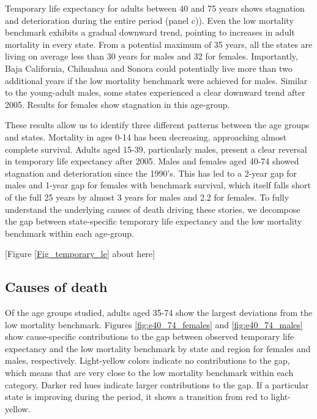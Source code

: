 \documentclass[11.5pt]{article}
\begin{document}
\begin{spacing}{1.5}
Temporary life expectancy for adults between 40 and 75 years shows stagnation and deterioration during the entire period (panel c)). Even the low mortality benchmark exhibits a gradual downward trend, pointing to increases in adult mortality in every state. From a potential maximum of 35 years, 
all the states are living on average less than 30 years for males and 32 for females. Importantly,  Baja California, Chihuahua and Sonora could potentially live more than two additional years if the low mortality benchmark were achieved for males. Similar to the young-adult males, some states experienced a  clear downward trend after 2005. Results for females show stagnation in this age-group. 

These results allow us to identify three different patterns between the age groups and states. Mortality in ages 0-14 has been decreasing, approaching almost complete survival. Adults aged 15-39, particularly males, present a clear reversal in temporary life expectancy after 2005. Males and females aged 40-74 showed stagnation and deterioration since the 1990's. This has led to a 2-year gap for males and 1-year gap for females with benchmark survival, which itself falls short of the full 25 years by almost 3 years for males and 2.2 for females. To fully understand the underlying causes of death driving these stories, we decompose the gap between state-specific temporary life expectancy and the low mortality benchmark within each age-group.\\

\begin{center}
[Figure \ref{Fig_temporary_le} about here]
\end{center}




\subsection*{Causes of death}

Of the age groups studied, adults aged 35-74 show the largest deviations from the low mortality benchmark. Figures  \ref{fig:e40_74_females} and \ref{fig:e40_74_males} show cause-specific contributions to the gap between observed temporary life expectancy and the low mortality benchmark by state and region for females and males, respectively. Light-yellow colors indicate no contributions to the gap, which means that are very close to the low mortality benchmark within each category. Darker red hues indicate larger contributions to the gap. If a particular state is improving during the period, it shows a transition from red to light-yellow. 


\end{spacing}
\end{document}

